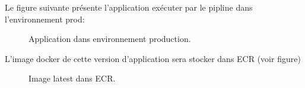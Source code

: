 {      Le figure suivante présente l'application exécuter par le pipline dans l'environnement prod:
  \begin{figure}[H]
      \begin{center}
      \end{center}
      \caption{Application dans environnement production.}
     \end{figure}
     L'image docker de cette version d'application sera stocker dans ECR (voir figure)
     \begin{figure}[H]
      \begin{center}
      \end{center}
      \caption{Image latest dans ECR.}
     \end{figure}
   }
